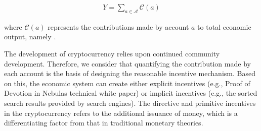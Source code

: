 \begin{align}
Y=\sum_{a\in \mathcal{A}} \mathcal{C}(a)
\end{align}

\noindent where $\mathcal{C}(a)$ represents the contributions made by account $a$ to total economic output, namely \nrcore.

The development of cryptocurrency relies upon continued community development. Therefore, we consider that quantifying the contribution made by each account is the basis of designing the reasonable incentive mechanism. Based on this, the economic system can create either explicit incentives (e.g., Proof of Devotion in Nebulas technical white paper) or implicit incentives (e.g., the sorted search results provided by search engines).
The directive and primitive incentives in the cryptocurrency refers to the additional issuance of money, which is a differentiating factor from that in traditional monetary theories.